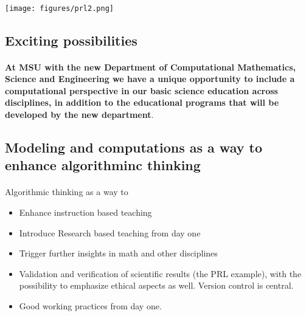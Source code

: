 \documentclass[%
twoside,                 %
final,                   %
10pt]{article}
\begin{document}
\paragraph{}


\centerline{\texttt{[image: figures/prl2.png]}}




\subsection{Exciting possibilities}

\paragraph{}

\textbf{At MSU with the new Department of Computational Mathematics, Science and Engineering we have a unique opportunity to include a computational perspective in our basic science education across disciplines, in addition to the educational programs that will be developed by the new department}.




\subsection{Modeling and computations as a way to enhance algorithminc thinking}

\paragraph{}

Algorithmic  thinking as a way to

\begin{itemize}
\item Enhance instruction based teaching

\item Introduce Research based teaching  from day one

\item Trigger further insights in math and other disciplines 

\item Validation and verification of scientific results (the PRL example), with the possibility to emphasize ethical aspects as well. Version control is central.

\item Good working practices from day one.
\end{itemize}
\end{document}
